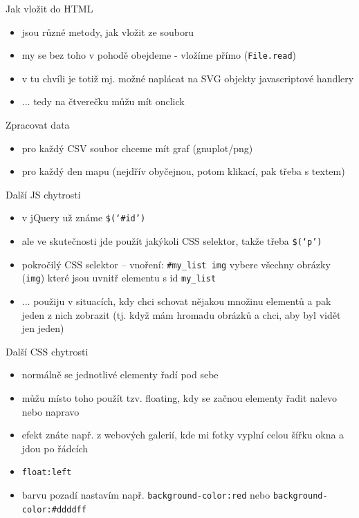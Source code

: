 \documentclass{beamer}
\begin{document}
\begin{frame}{Jak vložit do HTML}
  \begin{itemize}
    \item jsou různé metody, jak vložit ze souboru
    \item my se bez toho v pohodě obejdeme - vložíme přímo (\texttt{File.read})
    \item v tu chvíli je totiž mj. možné naplácat na SVG objekty javascriptové handlery
    \item ... tedy na čtverečku můžu mít onclick
  \end{itemize}
\end{frame}

\begin{frame}{Zpracovat data}
  \begin{itemize}
    \item pro každý CSV soubor chceme mít graf (gnuplot/png)
    \item pro každý den mapu (nejdřív obyčejnou, potom klikací, pak třeba s textem)
  \end{itemize}
\end{frame}

\begin{frame}{Další JS chytrosti}
  \begin{itemize}
    \item v jQuery už známe \texttt{\$(`\#id')}
    \item ale ve skutečnosti jde použít jakýkoli CSS selektor, takže třeba \texttt{\$(`p')}
    \item pokročilý CSS selektor -- vnoření: \texttt{\#my\_list img} vybere všechny obrázky (\texttt{img}) které jsou uvnitř elementu s id \texttt{my\_list}
    \item ... použiju v situacích, kdy chci schovat nějakou množinu elementů a pak jeden z nich zobrazit (tj. když mám hromadu obrázků a chci, aby byl vidět jen jeden)
  \end{itemize}
\end{frame}

\begin{frame}{Další CSS chytrosti}
  \begin{itemize}
    \item normálně se jednotlivé elementy řadí pod sebe
    \item můžu místo toho použít tzv. floating, kdy se začnou elementy řadit nalevo nebo napravo
    \item efekt znáte např. z webových galerií, kde mi fotky vyplní celou šířku okna a jdou po řádcích
    \item \texttt{float:left}
    \item barvu pozadí nastavím např. \texttt{background-color:red} nebo \texttt{background-color:\#ddddff}
  \end{itemize}
\end{frame}
\end{document}
